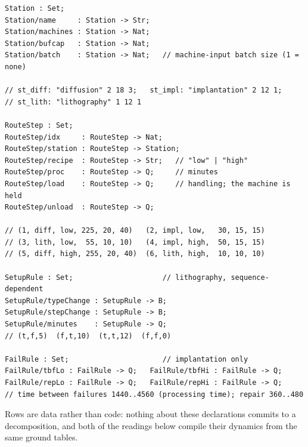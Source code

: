 \begin{Verbatim}[fontsize=\small,frame=leftline,rulecolor=\color{accentmid},framesep=3mm,xleftmargin=3mm]
Station : Set;
Station/name     : Station -> Str;
Station/machines : Station -> Nat;
Station/bufcap   : Station -> Nat;
Station/batch    : Station -> Nat;   // machine-input batch size (1 = none)

// st_diff: "diffusion" 2 18 3;   st_impl: "implantation" 2 12 1;
// st_lith: "lithography" 1 12 1

RouteStep : Set;
RouteStep/idx     : RouteStep -> Nat;
RouteStep/station : RouteStep -> Station;
RouteStep/recipe  : RouteStep -> Str;   // "low" | "high"
RouteStep/proc    : RouteStep -> Q;     // minutes
RouteStep/load    : RouteStep -> Q;     // handling; the machine is held
RouteStep/unload  : RouteStep -> Q;

// (1, diff, low, 225, 20, 40)   (2, impl, low,   30, 15, 15)
// (3, lith, low,  55, 10, 10)   (4, impl, high,  50, 15, 15)
// (5, diff, high, 255, 20, 40)  (6, lith, high,  10, 10, 10)

SetupRule : Set;                     // lithography, sequence-dependent
SetupRule/typeChange : SetupRule -> B;
SetupRule/stepChange : SetupRule -> B;
SetupRule/minutes    : SetupRule -> Q;
// (t,f,5)  (f,t,10)  (t,t,12)  (f,f,0)

FailRule : Set;                      // implantation only
FailRule/tbfLo : FailRule -> Q;   FailRule/tbfHi : FailRule -> Q;
FailRule/repLo : FailRule -> Q;   FailRule/repHi : FailRule -> Q;
// time between failures 1440..4560 (processing time); repair 360..480
\end{Verbatim}

\noindent Rows are data rather than code: nothing about these
declarations commits to a decomposition, and both of the readings
below compile their dynamics from the same ground tables.

